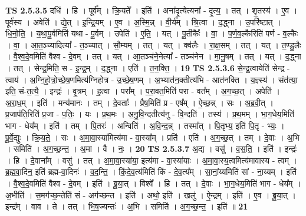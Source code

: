 \documentclass[17pt]{extarticle}
\begin{document}
                                \textbf{ TS 2.5.3.5} \newline
                  दधि॑ । हि । पूर्व᳚म् । क्रि॒यते᳚ । इति॑ । अना॑दृ॒त्येत्यना᳚ - दृ॒त्य॒ । तत् । शृ॒तस्य॑ । ए॒व । पूर्व॑स्य । अवेति॑ । द्ये॒त् । इ॒न्द्रि॒यम् । ए॒व । अ॒स्मि॒न्न् । वी॒र्य᳚म् । श्रि॒त्वा । द॒द्ध्ना । उ॒परि॑ष्टात् । धि॒नो॒ति॒ । य॒था॒पू॒र्वमिति॑ यथा - पू॒र्वम् । उपेति॑ । ए॒ति॒ । यत् । पू॒तीकैः᳚ । वा॒ । प॒र्ण॒व॒ल्कैरिति॑ पर्ण - व॒ल्कैः । वा॒ । आ॒त॒ञ्च्यादित्या᳚ - त॒ञ्च्यात् । सौ॒म्यम् । तत् । यत् । क्व॑लैः । रा॒क्ष॒सम् । तत् । यत् । त॒ण्डु॒लैः । वै॒श्व॒दे॒वमिति॑ वैश्व - दे॒वम् । तत् । यत् । आ॒तञ्च॑ने॒नेत्या᳚ - तञ्च॑नेन । मा॒नु॒षम् । तत् । यत् । द॒द्ध्ना । तत् । सेन्द्र॒मिति॒ स - इ॒न्द्र॒म् । द॒द्ध्ना । एति॑ । त॒न॒क्ति॒ । \textbf{  19} \newline
                  \newline
                                \textbf{ TS 2.5.3.6} \newline
                  से॒न्द्र॒त्वायेति॑ सेन्द्र - त्वाय॑ । अ॒ग्नि॒हो॒त्रो॒च्छे॒ष॒णमित्य॑ग्निहोत्र - उ॒च्छे॒ष॒णम् । अ॒भ्यात॑न॒क्तीत्य॑भि - आत॑नक्ति । य॒ज्ञ्स्य॑ । संत॑त्या॒ इति॒ सं-त॒त्यै॒ । इन्द्रः॑ । वृ॒त्रम् । ह॒त्वा । परा᳚म् । प॒रा॒वत॒मिति॑ परा - वत᳚म् । अ॒ग॒च्छ॒त् । अपेति॑ । अ॒रा॒ध॒म् । इति॑ । मन्य॑मानः । तम् । दे॒वताः᳚ । प्रैष॒मिति॑ प्र - एष᳚म् । ऐ॒च्छ॒न्न् । सः । अ॒ब्र॒वी॒त् । प्र॒जाप॑ति॒रिति॑ प्र॒जा - प॒तिः॒ । यः । प्र॒थ॒मः । अ॒नु॒वि॒न्दतीत्य॑नु - वि॒न्दति॑ । तस्य॑ । प्र॒थ॒मम् । भा॒ग॒धेय॒मिति॑ भाग - धेय᳚म् । इति॑ । तम् । पि॒तरः॑ । अन्विति॑ । अ॒वि॒न्द॒न्न् । तस्मा᳚त् । पि॒तृभ्य॒ इति॑ पि॒तृ - भ्यः॒ । पू॒र्वे॒द्युः । क्रि॒य॒ते॒ । सः । अ॒मा॒वा॒स्या॑मित्य॑मा - वा॒स्या᳚म् । प्रति॑ । एति॑ । अ॒ग॒च्छ॒त् । तम् । दे॒वाः । अ॒भि । समिति॑ । अ॒ग॒च्छ॒न्त॒ । अ॒मा । वै । नः॒ । \textbf{  20} \newline
                  \newline
                                \textbf{ TS 2.5.3.7} \newline
                  अ॒द्य । वसु॑ । व॒स॒ति॒ । इति॑ । इन्द्रः॑ । हि । दे॒वाना᳚म् । वसु॑ । तत् । अ॒मा॒वा॒स्या॑या॒ इत्य॑मा - वा॒स्या॑याः । अ॒मा॒वा॒स्य॒त्वमित्य॑मावास्य - त्वम् । ब्र॒ह्म॒वा॒दिन॒ इति॑ ब्रह्म-वा॒दिनः॑ । व॒द॒न्ति॒ । किं॒दे॒व॒त्य॑मिति॑ किं - दे॒व॒त्य᳚म् । सा॒नां॒य्यमिति॑ सां - ना॒य्यम् । इति॑ । वै॒श्व॒दे॒वमिति॑ वैश्व - दे॒वम् । इति॑ । ब्रू॒या॒त् । विश्वे᳚ । हि । तत् । दे॒वाः । भा॒ग॒धेय॒मिति॑ भाग - धेय᳚म् । अ॒भीति॑ । स॒मग॑च्छ॒न्तेति॑ सं - अग॑च्छन्त । इति॑ । अथो॒ इति॑ । खलु॑ । ऐ॒न्द्रम् । इति॑ । ए॒व । ब्रू॒या॒त् । इन्द्र᳚म् । वाव । ते । तत् । भि॒ष॒ज्यन्तः॑ । अ॒भि । समिति॑ । अ॒ग॒च्छ॒न्त॒ । इति॑ ॥ \textbf{  21} \newline
\end{document}
